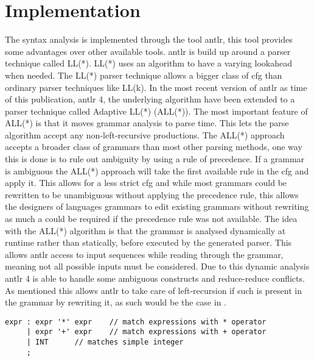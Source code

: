 \section{Implementation}

The syntax analysis is implemented through the tool \acrfull{antlr}, this tool provides some advantages over other available tools.
\acrshort{antlr} is build up around a parser technique called LL(*). %
LL(*) uses an algorithm to have a varying lookahead when needed. %
The LL(*) parser technique allows a bigger class of \acrshort{cfg} than ordinary parser techniques like LL(k). %
In the most recent version of \acrshort{antlr} as time of this publication, \acrshort{antlr} 4, the underlying algorithm have been extended to a parser technique called Adaptive LL(*) (ALL(*)). %
The most important feature of ALL(*) is that it moves grammar analysis to parse time.  %
This lets the parse algorithm accept any non-left-recursive productions.
The ALL(*) approach accepts a broader class of grammars than most other parsing methods, one way this is done is to rule out ambiguity by using a rule of precedence. %
If a grammar is ambiguous the ALL(*) approach will take the first  available rule in the \acrshort{cfg} and apply it. %
This allows for a less strict \acrshort{cfg} and while most grammars could be rewritten to be unambiguous without applying the precedence rule, this allows the designers of languages grammars to edit existing grammars without rewriting as much a could be required if the precedence rule was not available.	
The idea with the ALL(*) algorithm is that the grammar is analysed dynamically at runtime rather than statically, before executed by the generated parser. %
This allows \acrshort{antlr} access to input sequences while reading through the grammar, meaning not all possible inputs must be considered.
Due to this dynamic analysis \acrshort{antlr} 4 is able to handle some ambiguous constructs and reduce-reduce conflicts.
As mentioned this allows \acrshort{antlr} to take care of left-recursion if such is present in the grammar by rewriting it, as such would be the case in .

\begin{lstlisting}[caption=An ambiguous rule for expr,frame=tlrb,label={lst:amb}]
expr : expr '*' expr 	// match expressions with * operator
     | expr '+' expr 	// match expressions with + operator
     | INT 		// matches simple integer
     ;
\end{lstlisting}

